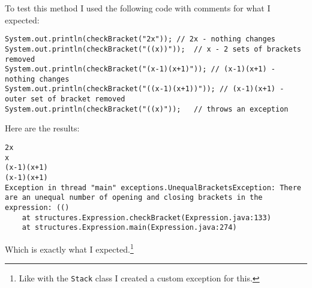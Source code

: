 \documentclass[../../../../main.tex]{subfiles}
\begin{document}
\newpage\noindent
To test this method I used the following code with comments for what I expected:
\begin{verbatim}
System.out.println(checkBracket("2x"));	// 2x - nothing changes
System.out.println(checkBracket("((x))"));	// x - 2 sets of brackets removed
System.out.println(checkBracket("(x-1)(x+1)"));	// (x-1)(x+1) - nothing changes
System.out.println(checkBracket("((x-1)(x+1))")); // (x-1)(x+1) - outer set of bracket removed
System.out.println(checkBracket("((x)"));	// throws an exception
\end{verbatim}
Here are the results:
\begin{verbatim}
2x
x
(x-1)(x+1)
(x-1)(x+1)
Exception in thread "main" exceptions.UnequalBracketsException: There are an unequal number of opening and closing brackets in the expression: (()
	at structures.Expression.checkBracket(Expression.java:133)
	at structures.Expression.main(Expression.java:274)
\end{verbatim}
Which is exactly what I expected.\footnote{Like with the \texttt{Stack} class I  created a custom exception for this.}
\newpage
\end{document}
